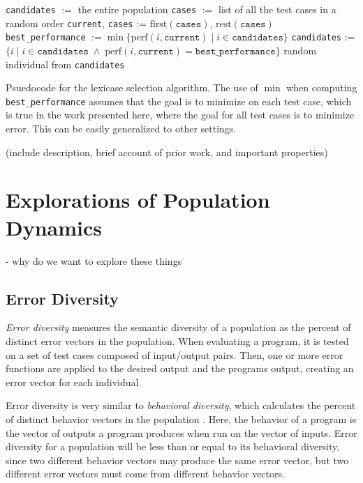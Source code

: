 \begin{algorithm}[tb]
	\begin{algorithmic}
		\STATE \texttt{candidates} $:=$ the entire population
		\STATE \texttt{cases} $:=$ list of all the test cases in a random order
			\STATE \texttt{current}, \texttt{cases} := $\textrm{first}(\texttt{cases})$, $\textrm{rest}(\texttt{cases})$
			\STATE \texttt{best\_performance} $:= \min \{ \textrm{perf}(i, \texttt{current}) \;|\; i \in \texttt{candidates} \}$
			\STATE \texttt{candidates} := $\{ i \;|\; i \in \texttt{candidates} \;\land\; \textrm{perf}(i, \texttt{current}) = \texttt{best\_performance}\}$
		\ENDWHILE
		\RETURN random individual from \texttt{candidates}
	\end{algorithmic}
	\caption{Psuedocode for the lexicase selection algorithm. The use of $\min$ when computing 
		\texttt{best\_performance} assumes that the goal is to minimize on each test case, which
		is true in the work presented here, where the goal for all test cases is to minimize error.
		This can be easily generalized to other settings.}
	\label{alg:lexicase}
\end{algorithm}

(include description, brief account of prior work, and important properties)



\section{Explorations of Population Dynamics}

- why do we want to explore these things

\subsection{Error Diversity}



\textit{Error diversity} measures the semantic diversity of a population as the percent of distinct error vectors in the population. When evaluating a program, it is tested on a set of test cases composed of input/output pairs. Then, one or more error functions are applied to the desired output and the programs output, creating an error vector for each individual.

Error diversity is very similar to \textit{behavioral diversity}, which calculates the percent of distinct behavior vectors in the population \citep{Jackson:2010:PPSN}. Here, the behavior of a program is the vector of outputs a program produces when run on the vector of inputs. Error diversity for a population will be less than or equal to its behavioral diversity, since two different behavior vectors may produce the same error vector, but two different error vectors must come from different behavior vectors.

